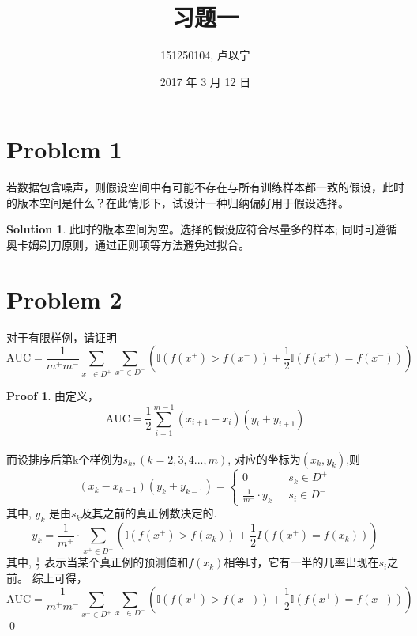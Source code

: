 \documentclass[a4paper,UTF8]{article}
\theoremstyle{definition}
\newtheorem*{solution}{Solution}
\newtheorem*{prove}{Proof}
\begin{document}
\title{习题一}
\author{151250104, 卢以宁}
\date{2017 年 3 月 12 日}


\maketitle


\section*{Problem 1}
若数据包含噪声，则假设空间中有可能不存在与所有训练样本都一致的假设，此时的版本空间是什么？在此情形下，试设计一种归纳偏好用于假设选择。

\begin{solution}
 此时的版本空间为空。选择的假设应符合尽量多的样本; 同时可遵循奥卡姆剃刀原则，通过正则项等方法避免过拟合。
\end{solution}

\section*{Problem 2}
对于有限样例，请证明
\[
\text{AUC} = \frac{1}{m^+m^-}\sum_{x^+\in D^+}\sum_{x^-\in D^-}\left(\mathbb{I}(f(x^+)>f(x^-))+\frac{1}{2}\mathbb{I}(f(x^+)=f(x^-))\right)
\]

\begin{prove}
由定义，\[ \text{AUC} =  \frac{1}{2} \sum^{m-1}_{i=1}(x_{i+1}-x_{i})(y_i+y_{i+1}) \] \\
而设排序后第k个样例为$s_k, (k = 2, 3, 4..., m)$, 对应的坐标为$(x_{k},y_{k})$,则
\begin{displaymath}
(x_{k}-x_{k-1})(y_k+y_{k-1}) = \left\{ \begin{array}{ll}
 0 & \textrm{ $s_k\in D^+$}\\
\frac{1}{m^-}\cdot y_k & \textrm{ $s_i\in D^-$}
  \end{array} \right.
\end{displaymath}
其中, $y_k$ 是由$s_k$及其之前的真正例数决定的. 
\[
y_k = \frac{1}{m^+}\cdot \sum_{x^+ \in D^+} \left( \mathbb{I} \left( f(x^+)>f(x_k) \right)  +  \frac{1}{2} {I}\left(f(x^+)=f(x_k)\right) \right)
\]
其中, $\frac{1}{2}$ 表示当某个真正例的预测值和$f(x_k)$相等时，它有一半的几率出现在$s_i$之前。
综上可得，
\[
\text{AUC} = \frac{1}{m^+m^-}\sum_{x^+\in D^+}\sum_{x^-\in D^-}\left(\mathbb{I}(f(x^+)>f(x^-))+\frac{1}{2}\mathbb{I}(f(x^+)=f(x^-))\right)
\]
\qed
\end{prove}
\end{document}
